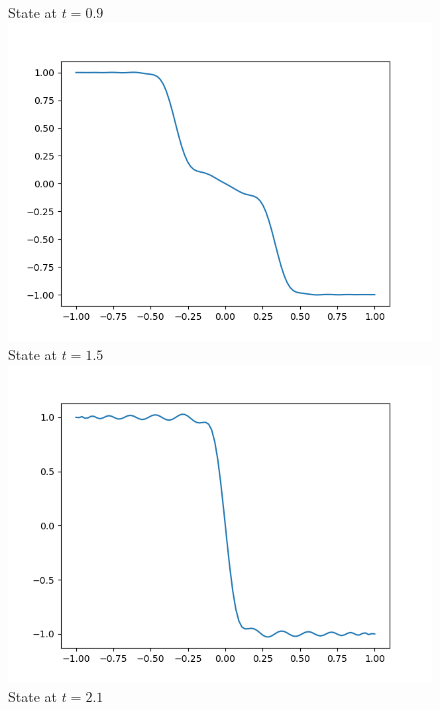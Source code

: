 \documentclass[a4paper,8pt]{article}
\begin{document}
\begin{figure}[h!]
\begin{multicols}{2}
State at $t=0.9$
\includegraphics[width=1\linewidth]{t1.5_plot.png}\\
State at $t=1.5$
\includegraphics[width=1\linewidth]{t2.1_plot.png}\\
State at $t=2.1$
\end{multicols}
\end{figure}

\newpage
\end{document}
